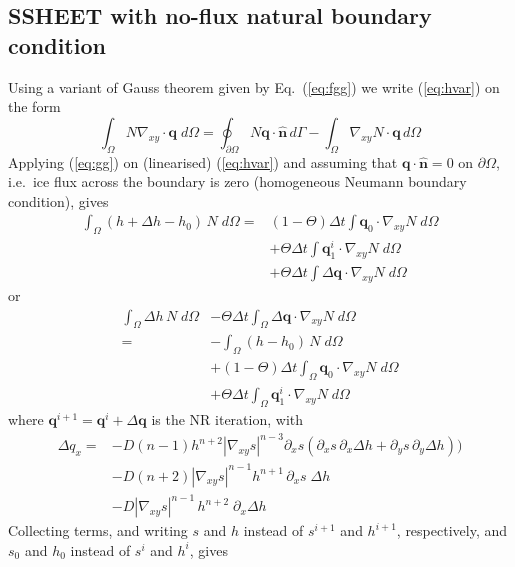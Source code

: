 \documentclass[10pt,a4paper]{book}
\newcommand{\p}{\partial}
\begin{document}
\subsection{SSHEET with no-flux natural boundary condition}
Using a variant of Gauss theorem given by Eq.~(\ref{eq:fgg}) we write (\ref{eq:hvar}) on the form
\begin{equation}
\int_{\Omega} N \nabla_{xy} \cdot \bm{q} \; d \Omega = \oint_{\p \Omega} N \bm{q} \cdot \hat{\bm{n}} \, d \Gamma - \int_{\Omega} \nabla_{xy} N \cdot \bm{q} \, d \Omega 
\label{eq:gg}
\end{equation}
Applying (\ref{eq:gg}) on (linearised) (\ref{eq:hvar}) and assuming
that $\bm{q} \cdot \hat{\bm{n}}=0$ on $\p \Omega$, i.e.\ ice flux
across the boundary is zero (homogeneous Neumann boundary condition),
gives
\begin{align*} 
\int_{\Omega}  (h+\Delta h - h_0) \, N \; d \Omega 
   =& (1-\Theta) \Delta t \int \bm{q}_0 \cdot \nabla_{xy}  N \; d \Omega \\ 
   &+  \Theta \Delta t \int \bm{q}_1^i \cdot \nabla_{xy} N \; d \Omega \\ 
   &+ \Theta \Delta t \int \Delta \bm{q} \cdot  \nabla_{xy} N \; d \Omega 
\end{align*}
or
\begin{align*} 
\int_{\Omega}  \Delta h  \, N \; d \Omega &- \Theta \Delta t \int_{\Omega} \Delta \bm{q} \cdot  \nabla_{xy} N \; d \Omega \\
    =& - \int_{\Omega}  (h-h_0) \, N \; d \Omega  \\
    &+ (1-\Theta) \Delta t \int_{\Omega} \bm{q}_0 \cdot \nabla_{xy}  N \; d \Omega \\ 
    &+  \Theta \Delta t \int_{\Omega} \bm{q}_1^i \cdot \nabla_{xy} N \; d \Omega 
\end{align*}
where $\bm{q}^{i+1}=\bm{q}^i+\Delta \bm{q}$ is the NR iteration, with
\begin{align*}
\Delta q_x       = & - D(n-1) h^{n+2} |\nabla_{xy} s|^{n-3} \p_x s ( \p_x s \,\p_x \Delta h + \p_y s \,\p_y \Delta h))  \\
                   & - D(n+2) |\nabla_{xy} s|^{n-1} h^{n+1} \, \p_x s \; \Delta h \\
                   & - D|\nabla_{xy}s |^{n-1} \, h^{n+2} \; \p_x \Delta h
\end{align*}
Collecting terms, and writing $s$ and $h$ instead of $s^{i+1}$ and $h^{i+1}$, respectively, and 
$s_0$ and $h_0$ instead of $s^{i}$ and $h^{i}$, gives
\end{document}

